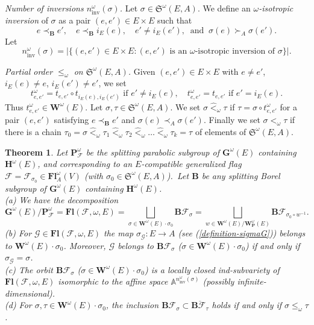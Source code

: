 \documentclass[12pt]{amsart}
\newtheorem{theorem}{Theorem}
\theoremstyle{definition}
\begin{document}
{\it Number of inversions $n_\mathrm{inv}^\omega(\sigma)$.} Let $\sigma\in\mathfrak{S}^\omega(E,A)$. We define an {\em $\omega$-isotropic inversion} of $\sigma$ as a pair $(e,e')\in E\times E$ such that
\[e\prec_\mathbf{B}e',\quad e\prec_\mathbf{B}i_E(e),\quad e'\not=i_E(e'),\ \mbox{ and }\ \sigma(e)\succ_A\sigma(e').\]
Let
\[n_\mathrm{inv}^\omega(\sigma)=|\{(e,e')\in E\times E:\mbox{$(e,e')$ is an $\omega$-isotropic inversion of $\sigma$}\}|.\]

{\em Partial order $\leq_\omega$ on $\mathfrak{S}^\omega(E,A)$.}
Given $(e,e')\in E\times E$ with $e\not=e'$, $i_E(e)\not=e$, $i_E(e')\not=e'$, we set
\[t_{e,e'}^\omega=t_{e,e'}\circ t_{i_E(e),i_E(e')}\mbox{ if }e'\not=i_E(e),\quad t_{e,e'}^\omega=t_{e,e'}\mbox{ if }e'=i_E(e).\]
Thus $t_{e,e'}^\omega\in\mathbf{W}^\omega(E)$. Let $\sigma,\tau\in\mathfrak{S}^\omega(E,A)$.
We set $\sigma\hat{<}_\omega\tau$ if $\tau=\sigma\circ t^\omega_{e,e'}$ for a pair $(e,e')$ satisfying
$e\prec_\mathbf{B}e'$ and $\sigma(e)\prec_A\sigma(e')$.
Finally we set $\sigma<_\omega\tau$ if there is a chain $\tau_0=\sigma\hat<_\omega\tau_1\hat<_\omega\tau_2\hat<_\omega\ldots\hat<_\omega\tau_k=\tau$ of elements of $\mathfrak{S}^\omega(E,A)$.

\begin{theorem}
\label{theorem-2}
Let $\mathbf{P}_\mathcal{F}^\omega$ be the splitting parabolic subgroup of $\mathbf{G}^\omega(E)$ containing $\mathbf{H}^\omega(E)$, and corresponding to an $E$-compatible generalized flag $\mathcal{F}=\mathcal{F}_{\sigma_0}\in\mathbf{Fl}^\omega_A(V)$ (with $\sigma_0\in\mathfrak{S}^\omega(E,A)$).\ Let $\mathbf{B}$ be any splitting Borel subgroup of $\mathbf{G}^\omega(E)$ containing $\mathbf{H}^\omega(E)$. \\
{\rm (a)} We have the decomposition
\[\mathbf{G}^\omega(E)/\mathbf{P}_\mathcal{F}^\omega=\mathbf{Fl}(\mathcal{F},\omega,E)=\bigsqcup_{\sigma\in\mathbf{W}^\omega(E)\cdot\sigma_0}\mathbf{B}\mathcal{F}_\sigma=\bigsqcup_{w\in \mathbf{W}^\omega(E)/\mathbf{W}^\omega_\mathbf{P}(E)}\mathbf{B}\mathcal{F}_{\sigma_0\circ w^{-1}}.\]
{\rm (b)}
For $\mathcal{G}\in\mathbf{Fl}(\mathcal{F},\omega,E)$ the map $\sigma_\mathcal{G}:E\to A$ (see (\ref{definition-sigmaG}))
belongs to $\mathbf{W}^\omega(E)\cdot\sigma_0$.
Moreover, $\mathcal{G}$ belongs to $\mathbf{B}\mathcal{F}_\sigma$ ($\sigma\in\mathbf{W}^\omega(E)\cdot\sigma_0$) if and only if $\sigma_\mathcal{G}=\sigma$. \\
{\rm (c)} The orbit $\mathbf{B}\mathcal{F}_\sigma$ ($\sigma\in\mathbf{W}^\omega(E)\cdot\sigma_0$) is a locally closed ind-subvariety of $\mathbf{Fl}(\mathcal{F},\omega,E)$ isomorphic to the affine space $\mathbb{A}^{n^\omega_\mathrm{inv}(\sigma)}$ (possibly infinite-dimensional). \\
{\rm (d)} For $\sigma,\tau\in\mathbf{W}^\omega(E)\cdot\sigma_0$, the inclusion $\mathbf{B}\mathcal{F}_\sigma\subset\overline{\mathbf{B}\mathcal{F}_\tau}$ holds if and only if $\sigma\leq_\omega\tau$.
\end{theorem}
\end{document}
